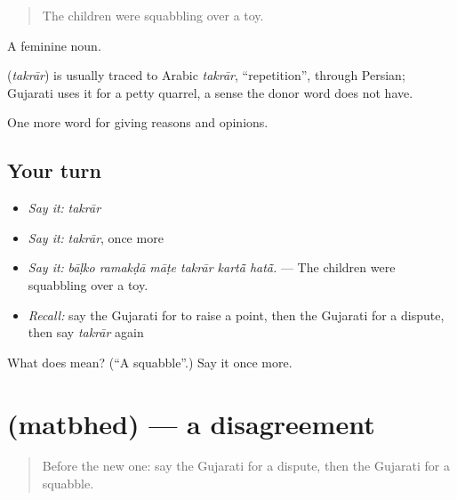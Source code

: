 \begin{quote}
The children were squabbling over a toy.
\end{quote}

A feminine noun.

\begin{cousinweb}
\textbf{} (\emph{takrār}) is usually traced to Arabic \emph{takrār}, \textquotedblleft{}repetition\textquotedblright{}, through Persian; Gujarati uses it for a petty quarrel, a sense the donor word does not have.
\end{cousinweb}

\begin{grammarlens}[title={What you've built}]
One more word for giving reasons and opinions.
\end{grammarlens}

\subsection*{Your turn}
\begin{itemize}
\raggedright
  \item \emph{Say it:} \emph{takrār}
  \item \emph{Say it:} \emph{takrār}, once more
  \item \emph{Say it:} \emph{bāḷko ramakḍā māṭe takrār kartā̃ hatā̃.} — The children were squabbling over a toy.
  \item \emph{Recall:} say the Gujarati for to raise a point, then the Gujarati for a dispute, then say \emph{takrār} again
\end{itemize}

\begin{tcolorbox}[breakable,colback=teal!4,colframe=teal!35!black,title={Before you move on}]
What does  mean? (\textquotedblleft{}A squabble\textquotedblright{}.) Say it once more.
\end{tcolorbox}
\section[\texorpdfstring{\gu{મતભેદ} (matbhed)}{મતભેદ (matbhed)}]{ (matbhed) — a disagreement}

\label{lesson:GU-C342-matbhed}



\begin{quote}
Before the new one: say the Gujarati for a dispute, then the Gujarati for a squabble.
\end{quote}

